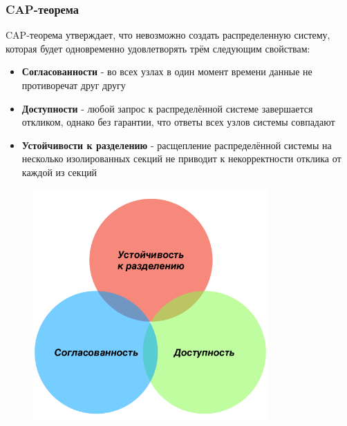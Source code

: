 \documentclass[pdf, 10pt, unicode,aspectratio=169]{beamer} %
\begin{document}
\begin{frame}
	\frametitle{CAP-теорема}

CAP-теорема утверждает, что невозможно создать распределенную систему, которая будет одновременно удовлетворять
трём следующим свойствам:



\begin{minipage}[c]{0.45\linewidth}
\begin{itemize}
\item \textbf{Согласованности} - во всех узлах в один момент времени данные не противоречат друг другу
\item \textbf{Доступности} - любой запрос к распределённой системе завершается откликом, однако без гарантии, что ответы всех узлов системы совпадают
\item \textbf{Устойчивости к разделению} - расщепление распределённой системы на несколько изолированных секций не приводит к некорректности отклика от каждой из секций
\end{itemize}
\end{minipage}
\begin{minipage}[c]{0.53\linewidth}
\begin{figure}[H]
    \includegraphics[width=0.8\textwidth]{CAP_t.png}
\end{figure}
\end{minipage}

\end{frame}
\end{document}
